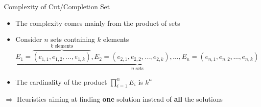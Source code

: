 \documentclass[8pt]{beamer}
\newcommand{\highlight}[1]{\textcolor{blue!50}{\textbf{#1}}}
\begin{document}
\begin{frame}{Complexity of Cut/Completion Set}
    \begin{itemize}
        \item The complexity comes mainly from the product of sets
        \pause
        \item Consider $n$ sets containing $k$ elements
        $\underbrace{E_1=\overbrace{(e_{1,1},e_{1,2},\ldots,e_{1,k})}^\text{$k$ elements},E_2=(e_{2,1},e_{2,2},\ldots,e_{2,k}),\ldots,E_n=(e_{n,1},e_{n,2},\ldots,e_{n,k})}_\text{$n$ sets}$
        \pause
        \item The cardinality of the product $\prod_{i=1}^{n}{E_i}$ is $k^n$
    \end{itemize}
    \pause
    $\Longrightarrow$ Heuristics aiming at finding \highlight{one} solution instead of \highlight{all} the solutions
    
    
\end{frame}
\end{document}
